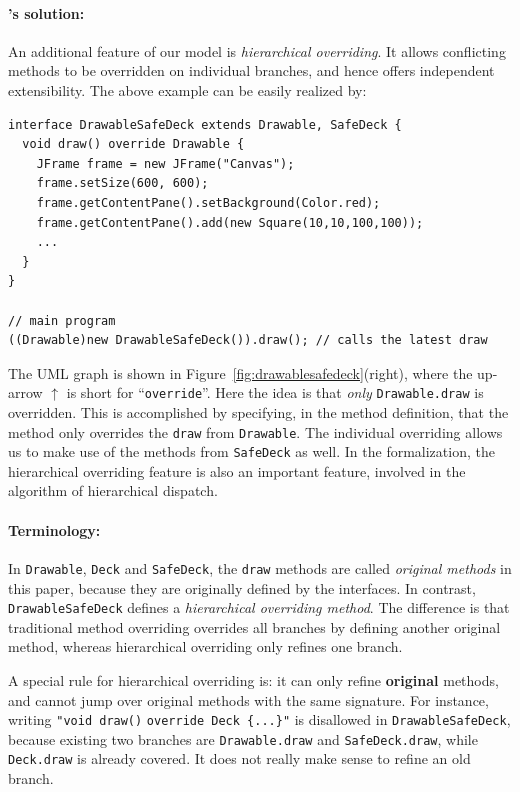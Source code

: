 \paragraph{\MIM{}'s solution:} An additional feature of our model is \textit{hierarchical overriding}. It allows conflicting methods
to be overridden on individual branches, and hence offers independent extensibility. The above example can be easily realized by:
\vspace{3pt}\begin{lstlisting}
interface DrawableSafeDeck extends Drawable, SafeDeck {
  void draw() override Drawable {
    JFrame frame = new JFrame("Canvas");
    frame.setSize(600, 600);
    frame.getContentPane().setBackground(Color.red);
    frame.getContentPane().add(new Square(10,10,100,100));
    ...
  }
}

// main program
((Drawable)new DrawableSafeDeck()).draw(); // calls the latest draw
\end{lstlisting}\vspace{3pt}

The UML graph is shown in Figure~\ref{fig:drawablesafedeck}(right), where
the up-arrow $\uparrow$ is short for ``\lstinline|override|''.
Here the idea is that \emph{only} \lstinline{Drawable.draw} is
overridden. This is accomplished by specifying, in the method
definition, that the method only overrides the \lstinline|draw| 
from \lstinline|Drawable|.  
The individual overriding allows us to make use of the methods from \lstinline|SafeDeck| as well. In the formalization, the 
hierarchical overriding feature is also an important feature, involved in the algorithm of hierarchical dispatch.

\paragraph{Terminology:} In \lstinline|Drawable|, \lstinline|Deck| and \lstinline|SafeDeck|, the \lstinline|draw| methods are called \textit{original methods} in this paper, because they are originally defined by the interfaces.
In contrast, \lstinline|DrawableSafeDeck| defines a \textit{hierarchical overriding method}. The difference is that traditional method overriding overrides all branches by defining another original method, whereas hierarchical overriding only refines one branch.

A special rule for hierarchical overriding is: it can only refine \textbf{original} methods, and cannot jump over original methods with the same signature. For instance, writing \lstinline|"void draw()| \lstinline|override Deck {...}"| is disallowed in \lstinline|DrawableSafeDeck|, because existing two branches are \lstinline|Drawable.draw| and \lstinline|SafeDeck.draw|, while \lstinline|Deck.draw| is already covered. It does not really make sense to refine an old branch. 

